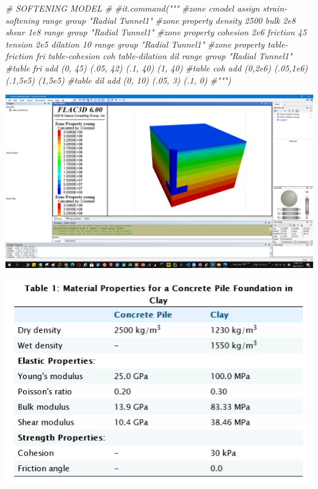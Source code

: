 \documentclass[a4paper, nobind]{templates/ociamthesis}
\newenvironment{Shaded}{\begin{snugshade}}{\end{snugshade}}
\newcommand{\CommentTok}[1]{\textcolor[rgb]{0.56,0.35,0.01}{\textit{#1}}}
\renewenvironment{Shaded}
{
  \vspace{10pt}%
  \begin{snugshade}%
}{%
  \end{snugshade}%
  \vspace{8pt}%
}
\begin{document}
\begin{Shaded}
\begin{Highlighting}[]
\CommentTok{\# SOFTENING MODEL \#}
\CommentTok{\#it.command("""}
\CommentTok{\#zone cmodel assign strain{-}softening range group "Radial Tunnel1"}
\CommentTok{\#zone property density 2500 bulk 2e8 shear 1e8 range group "Radial Tunnel1"}
\CommentTok{\#zone property cohesion 2e6 friction 45 tension 2e5 dilation 10 range group "Radial Tunnel1"}
\CommentTok{\#zone property table{-}friction \textquotesingle{}fri\textquotesingle{} table{-}cohesion \textquotesingle{}coh\textquotesingle{} table{-}dilation \textquotesingle{}dil\textquotesingle{} range group "Radial Tunnel1"}
\CommentTok{\#table \textquotesingle{}fri\textquotesingle{} add (0, 45) (.05, 42) (.1, 40) (1, 40)}
\CommentTok{\#table \textquotesingle{}coh\textquotesingle{} add (0,2e6) (.05,1e6) (.1,5e5) (1,5e5) }
\CommentTok{\#table \textquotesingle{}dil\textquotesingle{} add (0, 10) (.05,  3) (.1,  0)}
\CommentTok{\#""")}
\end{Highlighting}
\end{Shaded}

\includegraphics[width=1\linewidth]{myfigureeeeee/g}

\includegraphics[width=1\linewidth]{myfigureeeeee/concrete-properties}
\end{document}
